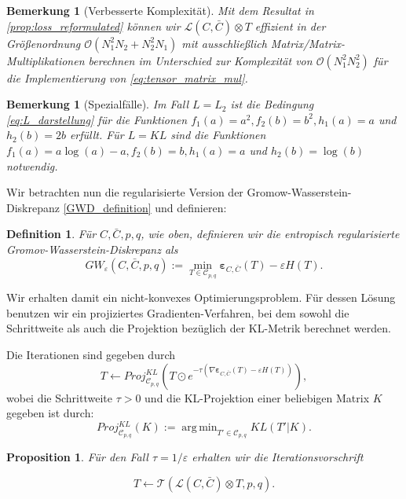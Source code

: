 \documentclass[twoside, 11pt,a4paper]{article}
\DeclareMathOperator*{\argmin}{arg\,min}
\newtheorem{proposition}[theorem]{Proposition}
\newtheorem{definition}[theorem]{Definition}
\newtheorem{remark}[theorem]{Bemerkung}
\numberwithin{equation}{section}
\begin{document}
	\begin{remark}[Verbesserte Komplexität]
		Mit dem Resultat in \autoref{prop:loss_reformulated} können wir $\mathcal{L} (C,\bar{C}) \otimes T$ effizient in der Größenordnung $\mathcal{O}(N_1^2N_2 + N_2^2N_1)$ mit ausschließlich Matrix/Matrix-Multiplikationen berechnen im Unterschied zur Komplexität von $\mathcal{O}(N_1^2N_2^2)$ für die Implementierung von \autoref{eq:tensor_matrix_mul}.
	\end{remark}
	
	\begin{remark}[Spezialfälle]
		Im Fall $L=L_2$ ist die Bedingung \autoref{eq:L_darstellung} für die Funktionen $f_1(a) = a^2, f_2(b) = b^2, h_1(a) = a$ und $h_2(b) = 2b$ erfüllt.
		Für $L=KL$ sind die Funktionen $f_1(a) = a \log (a) -a, f_2(b) = b, h_1(a) =a $ und $h_2(b) = \log (b)$ notwendig.
	\end{remark}
	
	Wir betrachten nun die regularisierte Version der Gromow-Wasserstein-Diskrepanz \ref{GWD_definition} und definieren:
	
	\begin{definition}
		Für $C, \bar{C}, p, q$, wie oben, definieren wir die entropisch regularisierte Gromov-Wasserstein-Diskrepanz als 
		\begin{equation}
		GW_{\varepsilon}(C,\bar{C}, p, q):=\min_{T \in \mathcal{C}_{p, q}} \boldsymbol{\varepsilon}_{C, \bar{C}}(T) -\varepsilon H(T).
		\end{equation}
	\end{definition}
	
	Wir erhalten damit ein nicht-konvexes Optimierungsproblem. Für dessen Lösung benutzen wir ein projiziertes Gradienten-Verfahren, bei dem sowohl die Schrittweite als auch die Projektion bezüglich der KL-Metrik berechnet werden.
	
	Die Iterationen sind gegeben durch
	\begin{equation}
	T \leftarrow Proj_{\mathcal{C}_{p,q}}^{KL} \left(T \odot e^{-\tau( \nabla \boldsymbol{\varepsilon}_{C, \bar{C}}(T) -\varepsilon H(T))} \right), \label{iteration_projection}
	\end{equation}
	wobei die Schrittweite $\tau > 0$ und die KL-Projektion einer beliebigen Matrix $K$ gegeben ist durch:
	\begin{equation}
	Proj_{\mathcal{C}_{p,q}}^{KL}(K) := \argmin_{T' \in \mathcal{C}_{p,q}} KL(T'|K).
	\end{equation}
	
	\begin{proposition} \label{prop:iteration_GW_eps}
		Für den Fall $\tau= 1/\varepsilon$ erhalten wir die Iterationsvorschrift
		
		\begin{equation}
		T \leftarrow \mathcal{T}(\mathcal{L} (C, \bar{C}) \otimes T,p,q). \label{simple_iteration}
		\end{equation}
	\end{proposition}
	
\end{document}

